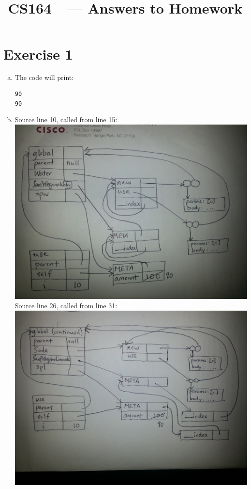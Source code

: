 \documentclass[11pt]{article}
\title{CS164\ \Session\  --- Answers to Homework \Homework}
\author{\Name}
\begin{document}
\maketitle
{}
\setcounter{problemnumber}{0}

\section*{Exercise 1}
\begin{enumerate}[(a)]
\item The code will print: \begin{verbatim}
90
90
\end{verbatim}
\item Source line 10, called from line 15:\\
\includegraphics[scale=0.125]{env2}\\
Source line 26, called from line 31:\\
\includegraphics[scale=0.125]{env3}

\end{enumerate}
\end{document}
